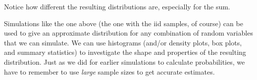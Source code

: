 \documentclass[twoside]{book}\usepackage[]{graphicx}\usepackage[]{xcolor}
\newlength{\tempfmlength}
\newenvironment{fmpage}[1]
     {
	 \medskip
	 \setlength{\tempfmlength}{#1}
	 \begin{lrbox}{\fmbox}
	   \begin{minipage}{#1}
		 \vspace*{.02\tempfmlength}
		 \hfill
	   \begin{minipage}{.95 \tempfmlength}}
		 {\end{minipage}\hfill
		 \vspace*{.015\tempfmlength}
		 \end{minipage}\end{lrbox}\fbox{\usebox{\fmbox}}
	 \medskip
	 }
\newenvironment{boxedText}[1][.98\textwidth]%
{%
\begin{center}
\begin{fmpage}{#1}
}%
{%
\end{fmpage}
\end{center}
}
\begin{document}
Notice how different the resulting distributions are, especially for the sum.

Simulations like the one above (the one with the iid samples, of course) can be used to give an approximate distribution for any combination
of random variables that we can simulate. We can use histograms (and/or density plots, box plots, and summary statistics) to investigate the shape and properties of the resulting distribution.  Just as we did for earlier simulations to calculate probabilities, we have to remember to use \emph{large} sample sizes to get accurate estimates.

% 
% 
% 
% 
% 
% 
\end{document}
